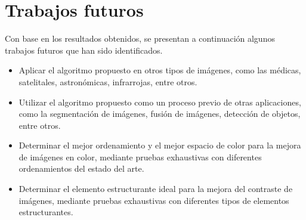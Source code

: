 
\section{Trabajos futuros}

Con base en los resultados obtenidos, se presentan a continuación algunos trabajos futuros que han sido identificados.

\begin{itemize}
	
	\item Aplicar el algoritmo propuesto en otros tipos de imágenes, como las médicas, satelitales, astronómicas, infrarrojas, entre otros.
	
	\item Utilizar el algoritmo propuesto como un proceso previo de otras aplicaciones, como la segmentación de imágenes, fusión de imágenes, detección de objetos, entre otros. 
	
	\item Determinar el mejor ordenamiento y el mejor espacio de color para la mejora de imágenes en color, mediante pruebas exhaustivas con diferentes ordenamientos del estado del arte.
	
	\item Determinar el elemento estructurante ideal para la mejora del contraste de imágenes, mediante pruebas exhaustivas con diferentes tipos de elementos estructurantes.
	
	
\end{itemize}
